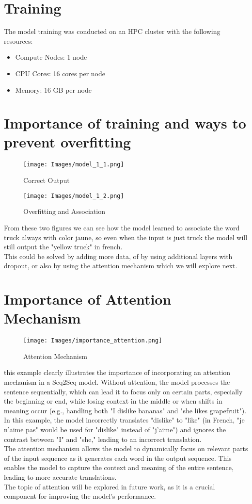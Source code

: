 \documentclass{article}
\begin{document}
\section{Training}
The model training was conducted on an HPC cluster with the following resources:
\begin{itemize}
    \item Compute Nodes: 1 node
    \item CPU Cores: 16 cores per node
    \item Memory: 16 GB per node
\end{itemize}  
\section{Importance of training and ways to prevent overfitting}
\begin{figure}[H]
    \centering
    \texttt{[image: Images/model\_1\_1.png]}
    \caption{Correct Output}
\end{figure}
\begin{figure}[H]
    \centering
    \texttt{[image: Images/model\_1\_2.png]}
    \caption{Overfitting and Association}
\end{figure}
From these two figures we can see how the model learned to associate the word truck always with color jaune, so even when the input is just truck the model will still output the "yellow truck" in french. \\ This could be solved by adding more data, of by using additional layers with dropout, or also by using the attention mechanism which we will explore next. 
\section{Importance of Attention Mechanism}
\begin{figure}[H]
    \centering
    \texttt{[image: Images/importance\_attention.png]}
    \caption{Attention Mechanism}
\end{figure}
this example clearly illustrates the importance of incorporating an attention mechanism in a Seq2Seq model. Without attention, the model processes the sentence sequentially, which can lead it to focus only on certain parts, especially the beginning or end, while losing context in the middle or when shifts in meaning occur (e.g., handling both "I dislike bananas" and "she likes grapefruit").\\ 
In this example, the model incorrectly translates "dislike" to "like" (in French, "je n'aime pas" would be used for "dislike" instead of "j'aime") and ignores the contrast between "I" and "she," leading to an incorrect translation.\\
The attention mechanism allows the model to dynamically focus on relevant parts of the input sequence as it generates each word in the output sequence. This enables the model to capture the context and meaning of the entire sentence, leading to more accurate translations.\\
The topic of attention will be explored in future work, as it is a crucial component for improving the model's performance.
\end{document}
